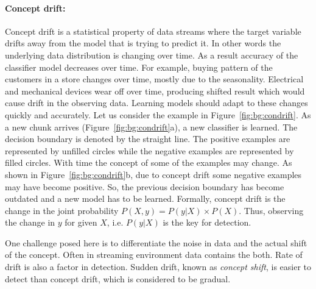 \documentclass[a4paper, 11pt, oneside]{book}
\begin{document}
\paragraph{Concept drift:}
Concept drift is a statistical property of data streams where the target variable drifts away from the model that is trying to predict it. In other words the underlying data distribution is changing over time. As a result accuracy of the classifier model decreases over time. For example, buying pattern of the customers in a store changes over time, mostly due to the seasonality. Electrical and mechanical devices wear off over time, producing shifted result which would cause drift in the observing data. Learning models should adapt to these changes quickly and accurately. Let us consider the example in Figure~\ref{fig:bg:condrift}. As a new chunk arrives (Figure~\ref{fig:bg:condrift}a), a new classifier is learned. The decision boundary is denoted by the straight line. The positive examples are represented by unfilled circles while the negative examples are represented by filled circles. With time the concept of some of the examples may change. As shown in Figure~\ref{fig:bg:condrift}b, due to concept drift some negative examples may have become positive. So, the previous decision boundary has become outdated and a new model has to be learned. Formally, concept drift is the change in the joint probability \(P(X, y) = P(y|X) \times P(X)\). Thus, observing the change in $y$ for given $X$, i.e. $P(y|X)$ is the key for detection.

One challenge posed here is to differentiate the noise in data and the actual shift of the concept. Often in streaming environment data contains the both. Rate of drift is also a factor in detection. Sudden drift, known as {\it concept shift}, is easier to detect than concept drift, which is considered to be gradual.
\end{document}
